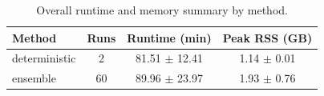 \begin{table}[t]
\centering
\caption{Overall runtime and memory summary by method.}
\label{tab:runtime_mode_summary}
\begin{tabular}{lccc}
\toprule
Method & Runs & Runtime (min) & Peak RSS (GB) \\
\midrule
deterministic & 2 & 81.51 $\pm$ 12.41 & 1.14 $\pm$ 0.01 \\
ensemble & 60 & 89.96 $\pm$ 23.97 & 1.93 $\pm$ 0.76 \\
\bottomrule
\end{tabular}
\end{table}
